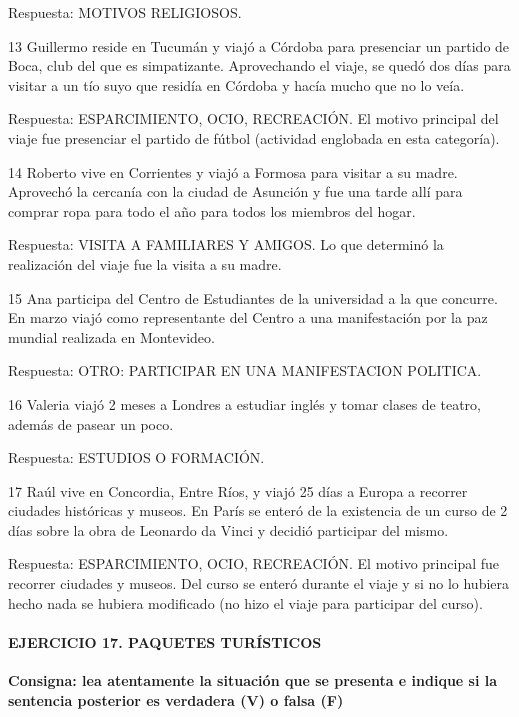 \documentclass[
  openany]{book}
\begin{document}
Respuesta: MOTIVOS RELIGIOSOS.

13 Guillermo reside en Tucumán y viajó a Córdoba para presenciar un partido de Boca, club del que es simpatizante. Aprovechando el viaje, se quedó dos días para visitar a un tío suyo que residía en Córdoba y hacía mucho que no lo veía.

Respuesta: ESPARCIMIENTO, OCIO, RECREACIÓN. El motivo principal del viaje fue presenciar el partido de fútbol (actividad englobada en esta categoría).

14 Roberto vive en Corrientes y viajó a Formosa para visitar a su madre. Aprovechó la cercanía con la ciudad de Asunción y fue una tarde allí para comprar ropa para todo el año para todos los miembros del hogar.

Respuesta: VISITA A FAMILIARES Y AMIGOS. Lo que determinó la realización del viaje fue la visita a su madre.

15 Ana participa del Centro de Estudiantes de la universidad a la que concurre. En marzo viajó como representante del Centro a una manifestación por la paz mundial realizada en Montevideo.

Respuesta: OTRO: PARTICIPAR EN UNA MANIFESTACION POLITICA.

16 Valeria viajó 2 meses a Londres a estudiar inglés y tomar clases de teatro, además de pasear un poco.

Respuesta: ESTUDIOS O FORMACIÓN.

17 Raúl vive en Concordia, Entre Ríos, y viajó 25 días a Europa a recorrer ciudades históricas y museos. En París se enteró de la existencia de un curso de 2 días sobre la obra de Leonardo da Vinci y decidió participar del mismo.

Respuesta: ESPARCIMIENTO, OCIO, RECREACIÓN. El motivo principal fue recorrer ciudades y museos. Del curso se enteró durante el viaje y si no lo hubiera hecho nada se hubiera modificado (no hizo el viaje para participar del curso).

\hypertarget{ejercicio-17.-paquetes-turuxedsticos-1}{%
\paragraph{\texorpdfstring{\textbf{EJERCICIO 17. PAQUETES TURÍSTICOS}}{EJERCICIO 17. PAQUETES TURÍSTICOS}}\label{ejercicio-17.-paquetes-turuxedsticos-1}}

\textbf{Consigna: lea atentamente la situación que se presenta e indique si la sentencia posterior es verdadera (V) o falsa (F)}
\end{document}
